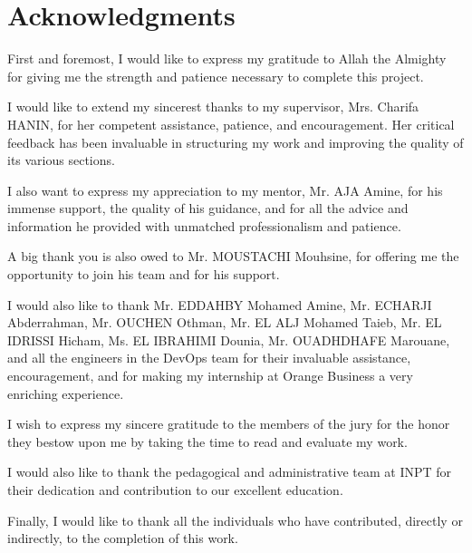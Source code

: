 \chapter*{Acknowledgments}


First and foremost, I would like to express my gratitude to Allah the Almighty for giving me the strength and patience necessary to complete this project.

I would like to extend my sincerest thanks to my supervisor, Mrs. Charifa HANIN, for her competent assistance, patience, and encouragement. Her critical feedback has been invaluable in structuring my work and improving the quality of its various sections.

I also want to express my appreciation to my mentor, Mr. AJA Amine, for his immense support, the quality of his guidance, and for all the advice and information he provided with unmatched professionalism and patience.

A big thank you is also owed to Mr. MOUSTACHI Mouhsine, for offering me the opportunity to join his team and for his support.

I would also like to thank Mr. EDDAHBY Mohamed Amine, Mr. ECHARJI Abderrahman, Mr. OUCHEN Othman, Mr. EL ALJ Mohamed Taieb, Mr. EL IDRISSI Hicham, Ms. EL IBRAHIMI Dounia, Mr. OUADHDHAFE Marouane, and all the engineers in the DevOps team for their invaluable assistance, encouragement, and for making my internship at Orange Business a very enriching experience.

I wish to express my sincere gratitude to the members of the jury for the honor they bestow upon me by taking the time to read and evaluate my work.

I would also like to thank the pedagogical and administrative team at INPT for their dedication and contribution to our excellent education.

Finally, I would like to thank all the individuals who have contributed, directly or indirectly, to the completion of this work.